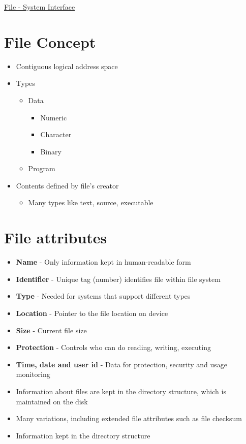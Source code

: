\documentclass{article}[18pt]
\begin{document}
\begin{center}
\underline{\huge File - System Interface}
\end{center}
\section{File Concept}
\begin{itemize}
	\item Contiguous logical address space
	\item Types
	\begin{itemize}
		\item Data
		\begin{itemize}
			\item Numeric
			\item Character
			\item Binary
		\end{itemize}
		\item Program
	\end{itemize}
	\item Contents defined by file's creator
	\begin{itemize}
		\item Many types like text, source, executable 
	\end{itemize}
\end{itemize}
\section{File attributes}
\begin{itemize}
	\item \textbf{Name} - Only information kept in human-readable form
	\item \textbf{Identifier} - Unique tag (number) identifies file within file system
	\item \textbf{Type} - Needed for systems that support different types
	\item \textbf{Location} - Pointer to the file location on device
	\item \textbf{Size} - Current file size
	\item \textbf{Protection} - Controls who can do reading, writing, executing
	\item \textbf{Time, date and user id} - Data for protection, security and usage monitoring
	\item Information about files are kept in the directory structure, which is maintained on the disk
	\item Many variations, including extended file attributes such as file checksum
	\item Information kept in the directory structure
\end{itemize}
\end{document}
